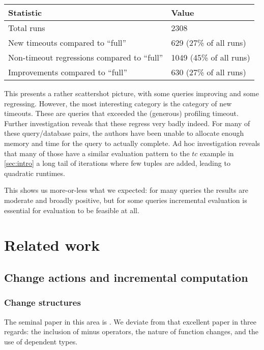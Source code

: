 \begin{center}
  \begin{tabular} {l l}
    Statistic & Value \\
    \toprule
    Total runs & 2308\\
    New timeouts compared to ``full'' & 629 (27\% of all runs)\\
    Non-timeout regressions compared to ``full'' & 1049 (45\% of all runs)\\
    Improvements compared to ``full'' & 630 (27\% of all runs)\\
    \bottomrule
  \end{tabular}
\end{center}
\medskip

This presents a rather scattershot picture, with some queries improving and some
regressing. However, the most interesting category is the category of new
timeouts. These are queries that exceeded the (generous) profiling timeout.
Further investigation reveals that these regress very badly indeed. For many of
these query/database pairs, the authors have been unable to allocate enough memory and time for
the query to actually complete. Ad hoc investigation reveals that many of those
have a similar evaluation pattern to the $tc$ example in \cref{sec:intro}
\textemdash{} a long tail of iterations where few tuples are added, leading to
quadratic runtimes.

This shows us more-or-less what we expected: for many queries the results are
moderate and broadly positive, but for some queries incremental evaluation is
essential for evaluation to be feasible at all.

\section{Related work}

\subsection{Change actions and incremental computation}

\subsubsection{Change structures}
\label{sec:relatedChangeStructures}

The seminal paper in this area is \textcite{cai2014changes}. We deviate from
that excellent paper in three regards: the
inclusion of minus operators, the nature of function changes, and the use of
dependent types.

